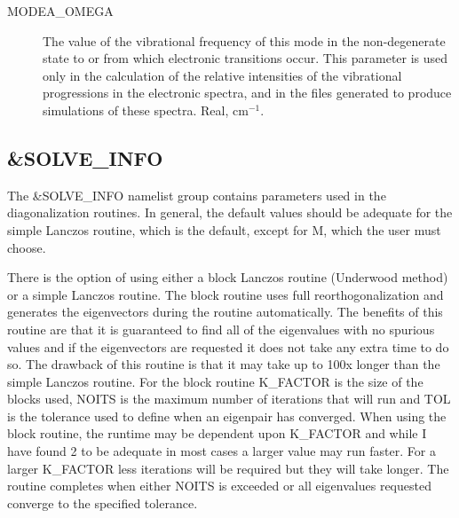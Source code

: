 \documentclass{article}
\newcommand{\wn}{cm$^{-1}$}
\begin{document}
\begin{description}
\item[MODEA\_OMEGA] The value of the vibrational frequency of this
  mode in the non-degenerate state to or from which electronic
  transitions occur. This parameter is used only in the calculation of
  the relative intensities of the vibrational progressions in the
  electronic spectra, and in the files generated to produce
  simulations of these spectra. Real, \wn .


\end{description}

\subsection{\&SOLVE\_INFO}

The \&SOLVE\_INFO namelist group contains parameters used in the
diagonalization routines. In general, the default values should be
adequate for the simple Lanczos routine, which is the default, except for M,
which the user must choose. 

There is the option of using either a block Lanczos routine (Underwood method) or a simple Lanczos routine. The block routine
uses full reorthogonalization and generates the eigenvectors during the routine
automatically. The benefits of this routine are that it is guaranteed to find all
of the eigenvalues with no spurious values and if the eigenvectors are requested
it does not take any extra time to do so.  The drawback of this routine is that it
may take up to 100x longer than the simple Lanczos routine. For the block routine
K\_FACTOR is the size of the blocks used, NOITS is the maximum number of iterations
that will run and TOL is the tolerance used to define when an eigenpair has converged.
When using the block routine, the runtime may be dependent upon K\_FACTOR and while
I have found 2 to be adequate in most cases a larger value may run faster.  For a 
larger K\_FACTOR less iterations will be required but they will take longer.  The routine
completes when either NOITS is exceeded or all eigenvalues requested converge to the 
specified tolerance.
\end{document}
